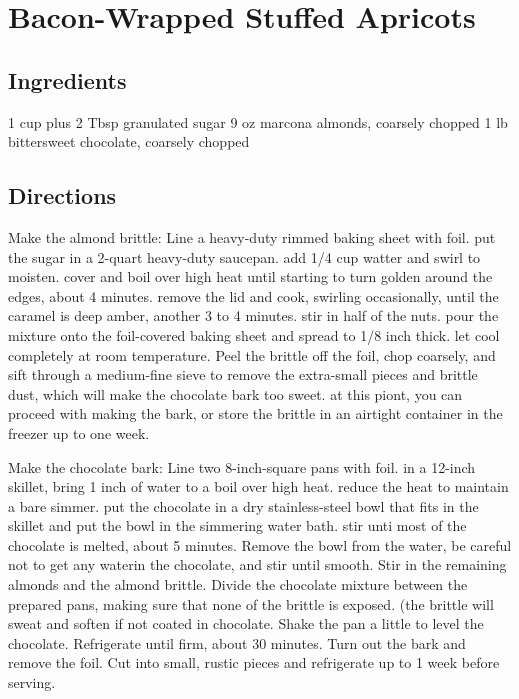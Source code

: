 \documentclass{article}
\newcounter{qcounter}
\begin{document}
\newcommand{\slfrac}[2]{\left.#1\middle/#2\right.}
\newcommand{\degree}{\ensuremath{^\circ}}

\section*{Bacon-Wrapped Stuffed Apricots}



\subsection*{Ingredients}
1 cup plus 2 Tbsp granulated sugar
9 oz marcona almonds, coarsely chopped
1 lb bittersweet chocolate, coarsely chopped

\subsection*{Directions}
\begin{list}{:~}{}
\item Make the almond brittle:  Line a heavy-duty rimmed baking sheet with foil.  put the sugar in a 2-quart heavy-duty saucepan.  add 1/4 cup watter and swirl to moisten.  cover and boil over high heat until starting to turn golden around the edges, about 4 minutes.  remove the lid and cook, swirling occasionally, until the caramel is deep amber, another 3 to 4 minutes.  stir in half of the nuts.  pour the mixture onto the  foil-covered baking sheet and spread to 1/8 inch thick.  let cool completely at room temperature.  Peel the brittle off the foil, chop coarsely, and sift through a medium-fine sieve to remove the extra-small pieces and brittle dust, which will make the chocolate bark too sweet.  at this piont, you can proceed with making the bark, or store the brittle in an airtight container in the freezer up to one week.  

Make the chocolate bark:  Line two 8-inch-square pans with foil.  in a 12-inch skillet, bring 1 inch of water to a boil over high heat.  reduce the heat to maintain a bare simmer.  put the chocolate in a dry stainless-steel bowl that fits in the skillet and put the bowl in the simmering water bath.  stir unti most of the chocolate is melted, about 5 minutes. Remove the bowl from the water, be careful not to get any waterin the chocolate, and stir until smooth.  Stir in the remaining almonds and the almond brittle.  Divide the chocolate mixture between the prepared pans, making sure that none of the brittle is exposed. (the brittle will sweat and soften if not coated in chocolate.  Shake the pan a little to level the chocolate.  Refrigerate until firm, about 30 minutes.  Turn out the bark and remove the foil.  Cut into small, rustic pieces and refrigerate up to 1 week before serving.
\end{list}
\end{document}
